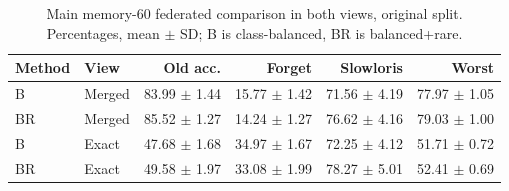 \begin{table}[t]
\centering
\caption{Main memory-60 federated comparison in both views, original split. Percentages, mean $\pm$ SD; B is class-balanced, BR is balanced+rare.}
\label{tab:typeview}
\footnotesize
\setlength{\tabcolsep}{2pt}
\begin{tabular}{llrrrr}
\toprule
Method & View & Old acc. & Forget & Slowloris & Worst\\
\midrule
B & Merged & 83.99 $\pm$ 1.44 & 15.77 $\pm$ 1.42 & 71.56 $\pm$ 4.19 & 77.97 $\pm$ 1.05\\
BR & Merged & 85.52 $\pm$ 1.27 & 14.24 $\pm$ 1.27 & 76.62 $\pm$ 4.16 & 79.03 $\pm$ 1.00\\
B & Exact & 47.68 $\pm$ 1.68 & 34.97 $\pm$ 1.67 & 72.25 $\pm$ 4.12 & 51.71 $\pm$ 0.72\\
BR & Exact & 49.58 $\pm$ 1.97 & 33.08 $\pm$ 1.99 & 78.27 $\pm$ 5.01 & 52.41 $\pm$ 0.69\\
\bottomrule
\end{tabular}
\end{table}
